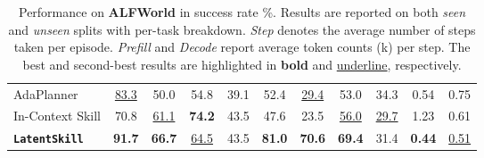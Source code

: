 \documentclass{llmxive}
\providecommand{\best}[1]{\textbf{#1}}
\providecommand{\second}[1]{\underline{#1}}
\providecommand{\textttt}[1]{\texttt{#1}}
\providecommand{\method}{\textbf{\textttt{LatentSkill}}}
\begin{document}
\begin{table}[t]
\begin{tabular}{
  l
  cccccc   %
  c|       %
  c        %
  cc       %
}
AdaPlanner
  & \second{83.3} & 50.0 & 54.8 & 39.1 & 52.4 & \second{29.4} & 53.0
  & 34.3 & 0.54 & 0.75 \\
In-Context Skill
  & 70.8 & \second{61.1} & \best{74.2} & 43.5 & 47.6 & 23.5 & \second{56.0}
  & \second{29.7} & 1.23 & 0.61 \\
\rowcolor{ourblue}
\textbf{\method{}}
  & \best{91.7} & \best{66.7} & \second{64.5} & 43.5
  & \best{81.0} & \best{70.6} & \best{69.4}
  & 31.4 & \best{0.44} & \second{0.51} \\
\bottomrule
\end{tabular}
\caption{
  Performance on \textbf{ALFWorld} in success rate \%.
  Results are reported on both \emph{seen} and \emph{unseen} splits
  with per-task breakdown.
  \emph{Step} denotes the average number of steps taken per episode.
  \emph{Prefill} and \emph{Decode} report average token counts
  (k) per step.
  The best and second-best results are highlighted in
  \textbf{bold} and \underline{underline}, respectively.
}
\label{tab:alfworld}
\end{table}
\end{document}
